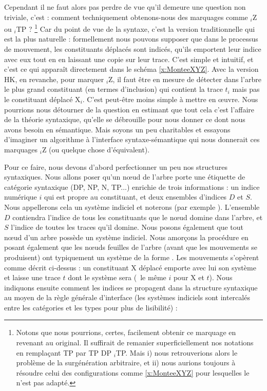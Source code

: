 Cependant il ne faut alors pas perdre de vue qu'il demeure une question non triviale, c'est : comment techniquement obtenons-nous des marquages comme ${}_i$Z ou ${}_i$TP ?%
\footnote{Notons que nous pourrions, certes, facilement obtenir ce marquage en revenant au  original.  Il suffirait de remanier superficiellement nos notations en remplaçant TP {\reecr}  par TP {\reecr} DP ${_i}$TP. Mais i) nous retrouverions alors le problème de la surgénération arbitraire, et ii) nous aurions toujours à résoudre celui des configurations comme  \ref{x:MonteeXYZ} pour lesquelles le  n'est pas adapté.}
Car du point de vue de la syntaxe, c'est la version traditionnelle qui est la plus naturelle :  formellement nous pouvons supposer que dans le processus de mouvement, les constituants déplacés sont indicés, qu'ils emportent leur indice avec eux tout en en laissant une copie sur leur trace.  C'est simple et intuitif, et c'est ce qui apparaît directement  dans le schéma \ref{x:MonteeXYZ}.
Avec la version HK, en revanche, pour marquer ${}_i$Z, il faut être en mesure de détecter dans l'arbre le plus grand constituant (en termes d'inclusion) qui contient la trace $t_i$ mais pas le constituant déplacé X$_i$.  C'est peut-être moins simple à mettre en \oe uvre.  Nous pourrions nous détourner de la question en estimant que tout cela c'est l'affaire de la théorie syntaxique, qu'elle se débrouille pour nous donner ce dont nous avons besoin en sémantique.
Mais soyons un peu charitables et essayons d'imaginer un algorithme à l'interface syntaxe-sémantique qui nous donnerait ces marquages ${}_i$Z (ou quelque chose d'équivalent).



Pour ce faire, nous devons d'abord perfectionner un peu nos structures syntaxiques.  Nous allons poser qu'un n\oe ud de l'arbre porte une étiquette de catégorie syntaxique (DP, NP, N, TP...) enrichie de trois informations : un indice numérique $i$ qui est propre au constituant, et deux ensembles d'indices $D$ et $S$.  Nous appellerons cela un système indiciel et noterons   (par exemple ). 
L'ensemble $D$ contiendra l'indice de tous les constituants que le n\oe ud domine dans l'arbre, et $S$ l'indice de toutes les traces qu'il domine.
Nous posons également que tout n\oe ud d'un arbre possède un système indiciel.
Nous amorçons la procédure en posant également que les n\oe uds feuilles de l'arbre (avant que les mouvements se produisent) ont typiquement un système de la forme . 
Les mouvements s'opèrent comme décrit ci-dessus : un constituant X déplacé emporte avec lui son système  et laisse une trace $t$ dont le système sera  (\ie\ le même $i$ pour X et $t$).
Nous indiquons ensuite comment les indices se propagent dans la structure syntaxique au moyen de la règle générale d'interface {\Next} (les systèmes indiciels sont intercalés entre les catégories et les types pour plus de lisibilité) :


